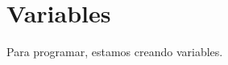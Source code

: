 \documentclass[../candidatura.tex]{subfiles}
\begin{document}
\section{Variables}

\esborrador

Para programar, estamos creando variables.

\newpage
\end{document}
